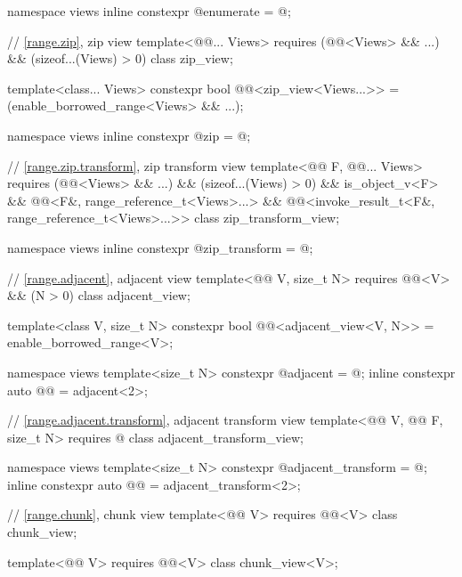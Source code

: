 \begin{codeblock}
{  namespace views { inline constexpr @\unspecnc@ enumerate = @\unspecnc@; }

  // \ref{range.zip}, zip view
  template<@@... Views>
    requires (@@<Views> && ...) && (sizeof...(Views) > 0)
  class zip_view;

  template<class... Views>
    constexpr bool @@<zip_view<Views...>> =
      (enable_borrowed_range<Views> && ...);

  namespace views { inline constexpr @\unspecnc@ zip = @\unspecnc@; }

  // \ref{range.zip.transform}, zip transform view
  template<@@ F, @@... Views>
    requires (@@<Views> && ...) && (sizeof...(Views) > 0) && is_object_v<F> &&
             @@<F&, range_reference_t<Views>...> &&
             @@<invoke_result_t<F&, range_reference_t<Views>...>>
  class zip_transform_view;

  namespace views { inline constexpr @\unspecnc@ zip_transform = @\unspecnc@; }

  // \ref{range.adjacent}, adjacent view
  template<@@ V, size_t N>
    requires @@<V> && (N > 0)
  class adjacent_view;

  template<class V, size_t N>
    constexpr bool @@<adjacent_view<V, N>> =
      enable_borrowed_range<V>;

  namespace views {
    template<size_t N>
      constexpr @\unspecnc@ adjacent = @\unspecnc@;
    inline constexpr auto @@ = adjacent<2>;
  }

  // \ref{range.adjacent.transform}, adjacent transform view
  template<@@ V, @@ F, size_t N>
    requires @\seebelow@
  class adjacent_transform_view;

  namespace views {
    template<size_t N>
      constexpr @\unspecnc@ adjacent_transform = @\unspecnc@;
    inline constexpr auto @@ = adjacent_transform<2>;
  }

  // \ref{range.chunk}, chunk view
  template<@@ V>
    requires @@<V>
  class chunk_view;

  template<@@ V>
    requires @@<V>
  class chunk_view<V>;

}
\end{codeblock}
